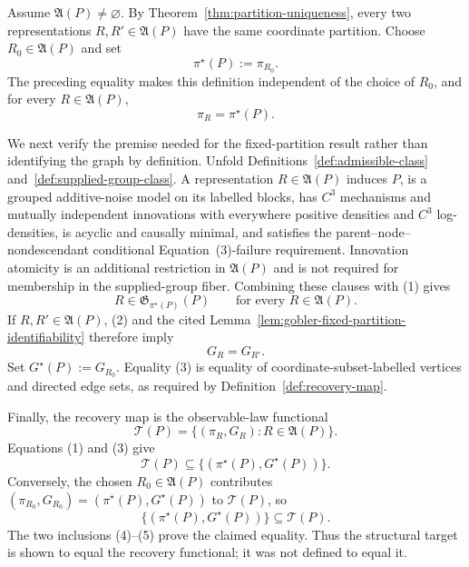 Assume \(\mathfrak A(P)\neq\varnothing\). By Theorem~\ref{thm:partition-uniqueness}, every two representations \(R,R'\in\mathfrak A(P)\) have the same coordinate partition. Choose \(R_0\in\mathfrak A(P)\) and set
\[
\pi^\star(P):=\pi_{R_0}.
\]
The preceding equality makes this definition independent of the choice of \(R_0\), and for every \(R\in\mathfrak A(P)\),
\[
\pi_R=\pi^\star(P). \tag{1}
\]

We next verify the premise needed for the fixed-partition result rather than identifying the graph by definition. Unfold Definitions~\ref{def:admissible-class} and~\ref{def:supplied-group-class}. A representation \(R\in\mathfrak A(P)\) induces \(P\), is a grouped additive-noise model on its labelled blocks, has \(C^3\) mechanisms and mutually independent innovations with everywhere positive densities and \(C^3\) log-densities, is acyclic and causally minimal, and satisfies the parent--node--nondescendant conditional Equation~(3)-failure requirement. Innovation atomicity is an additional restriction in \(\mathfrak A(P)\) and is not required for membership in the supplied-group fiber. Combining these clauses with (1) gives
\[
R\in\mathfrak G_{\pi^\star(P)}(P)
\qquad\text{for every }R\in\mathfrak A(P). \tag{2}
\]
If \(R,R'\in\mathfrak A(P)\), (2) and the cited Lemma~\ref{lem:gobler-fixed-partition-identifiability} therefore imply
\[
G_R=G_{R'}. \tag{3}
\]
Set \(G^\star(P):=G_{R_0}\). Equality (3) is equality of coordinate-subset-labelled vertices and directed edge sets, as required by Definition~\ref{def:recovery-map}.

Finally, the recovery map is the observable-law functional
\[
\mathcal T(P)=\{(\pi_R,G_R):R\in\mathfrak A(P)\}.
\]
Equations (1) and (3) give
\[
\mathcal T(P)\subseteq\{(\pi^\star(P),G^\star(P))\}. \tag{4}
\]
Conversely, the chosen \(R_0\in\mathfrak A(P)\) contributes \((\pi_{R_0},G_{R_0})=(\pi^\star(P),G^\star(P))\) to \(\mathcal T(P)\), so
\[
\{(\pi^\star(P),G^\star(P))\}\subseteq\mathcal T(P). \tag{5}
\]
The two inclusions (4)--(5) prove the claimed equality. Thus the structural target is shown to equal the recovery functional; it was not defined to equal it.